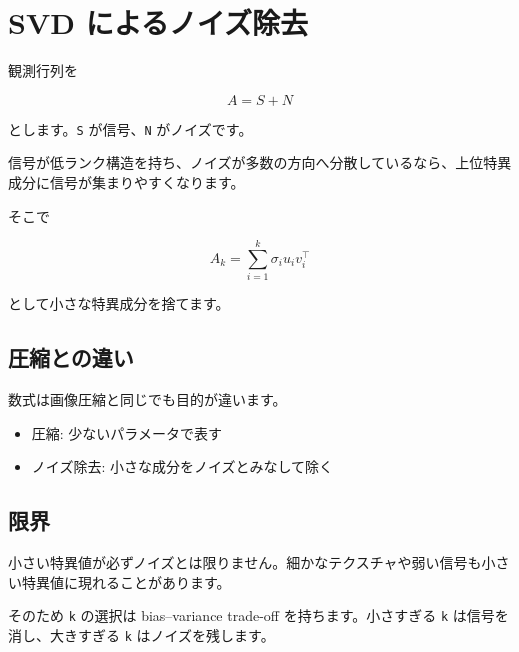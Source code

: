 \documentclass[
  11pt,
  a4paper,
]{ltjsarticle}
\author{}
\date{}
\providecommand{\tightlist}{%
  \setlength{\itemsep}{0pt}\setlength{\parskip}{0pt}}
\begin{document}
\hypertarget{svd-ux306bux3088ux308bux30ceux30a4ux30baux9664ux53bb}{%
\section{SVD
によるノイズ除去}\label{svd-ux306bux3088ux308bux30ceux30a4ux30baux9664ux53bb}}

観測行列を

\[
A=S+N
\]

とします。\texttt{S} が信号、\texttt{N} がノイズです。

信号が低ランク構造を持ち、ノイズが多数の方向へ分散しているなら、上位特異成分に信号が集まりやすくなります。

そこで

\[
A_k=\sum_{i=1}^k\sigma_i u_i v_i^\top
\]

として小さな特異成分を捨てます。

\hypertarget{ux5727ux7e2eux3068ux306eux9055ux3044}{%
\subsection{圧縮との違い}\label{ux5727ux7e2eux3068ux306eux9055ux3044}}

数式は画像圧縮と同じでも目的が違います。

\begin{itemize}
\tightlist
\item
  圧縮: 少ないパラメータで表す
\item
  ノイズ除去: 小さな成分をノイズとみなして除く
\end{itemize}

\hypertarget{ux9650ux754c}{%
\subsection{限界}\label{ux9650ux754c}}

小さい特異値が必ずノイズとは限りません。細かなテクスチャや弱い信号も小さい特異値に現れることがあります。

そのため \texttt{k} の選択は bias--variance trade-off
を持ちます。小さすぎる \texttt{k} は信号を消し、大きすぎる \texttt{k}
はノイズを残します。
\end{document}
